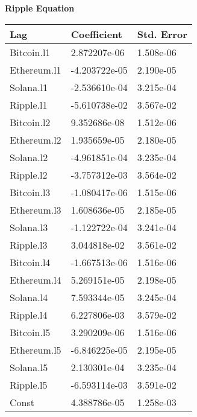 \begin{table}[ht]
\begin{multicols}{2}
\textbf{Ripple Equation}
\begin{tabular}{|l|l|l|}
\hline
\textbf{Lag} & \textbf{Coefficient} & \textbf{Std. Error} \\
\hline
Bitcoin.l1     & 2.872207e-06 & 1.508e-06 \\
Ethereum.l1    & -4.203722e-05 & 2.190e-05 \\
Solana.l1      & -2.536610e-04 & 3.215e-04 \\
Ripple.l1      & -5.610738e-02 & 3.567e-02 \\
\hline
Bitcoin.l2     & 9.352686e-08 & 1.512e-06 \\
Ethereum.l2    & 1.935659e-05 & 2.180e-05 \\
Solana.l2      & -4.961851e-04 & 3.235e-04 \\
Ripple.l2      & -3.757312e-03 & 3.564e-02 \\
\hline
Bitcoin.l3     & -1.080417e-06 & 1.515e-06 \\
Ethereum.l3    & 1.608636e-05 & 2.185e-05 \\
Solana.l3      & -1.122722e-04 & 3.241e-04 \\
Ripple.l3      & 3.044818e-02 & 3.561e-02 \\
\hline
Bitcoin.l4     & -1.667513e-06 & 1.516e-06 \\
Ethereum.l4    & 5.269151e-05 & 2.198e-05 \\
Solana.l4      & 7.593344e-05 & 3.245e-04 \\
Ripple.l4      & 6.227806e-03 & 3.579e-02 \\
\hline
Bitcoin.l5     & 3.290209e-06 & 1.516e-06 \\
Ethereum.l5    & -6.846225e-05 & 2.195e-05 \\
Solana.l5      & 2.130301e-04 & 3.235e-04 \\
Ripple.l5      & -6.593114e-03 & 3.591e-02 \\
\hline
Const          & 4.388786e-05 & 1.258e-03 \\
\hline
\end{tabular}
\end{multicols}
\end{table}
